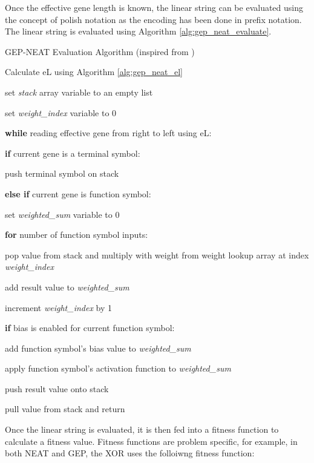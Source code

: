 \noindent Once the effective gene length is known, the linear string can be evaluated using the concept of polish notation as the encoding has been done in prefix notation. The linear string is evaluated using Algorithm \ref{alg:gep_neat_evaluate}.

\begin{algorithm}
	\caption{GEP-NEAT Evaluation Algorithm (inspired from \cite{peng2014improved})}\label{alg:gep_neat_evaluate}
	\begin{algorithmic}[1]
	\item Calculate eL using Algorithm \ref{alg:gep_neat_el}
	\item set \textit{stack} array variable to an empty list
	\item set \textit{weight\_index} variable to 0
	\item \textbf{while} reading effective gene from right to left using eL:
	\item \quad \textbf{if} current gene is a terminal symbol:
	\item \quad \quad push terminal symbol on stack
	\item \quad \textbf{else if} current gene is function symbol:
	\item \quad \quad set \textit{weighted\_sum} variable to 0
	\item \quad \quad \textbf{for} number of function symbol inputs:
	\item \quad \quad \quad pop value from stack and multiply with weight from weight lookup array at index \textit{weight\_index}
	\item \quad \quad \quad add result value to \textit{weighted\_sum}
	\item \quad \quad \quad increment \textit{weight\_index} by 1
	\item \quad \quad \textbf{if} bias is enabled for current function symbol:
	\item \quad \quad \quad add function symbol's bias value to \textit{weighted\_sum}
	\item \quad \quad apply function symbol's activation function to \textit{weighted\_sum}
	\item \quad \quad push result value onto stack
	\item pull value from stack and return
\end{algorithmic}
\end{algorithm}

\noindent Once the linear string is evaluated, it is then fed into a fitness function to calculate a fitness value. Fitness functions are problem specific, for example, in both NEAT and GEP, the XOR uses the folloiwng fitness function:

